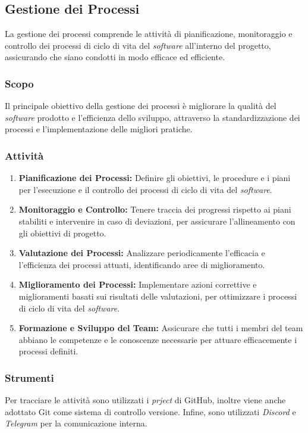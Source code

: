 \subsection{Gestione dei Processi}

La gestione dei processi comprende le attività di pianificazione, monitoraggio
e controllo dei processi di ciclo di vita del \textit{software} all'interno del
progetto, assicurando che siano condotti in modo efficace ed efficiente.

\subsubsection{Scopo}
Il principale obiettivo della gestione dei processi è migliorare la qualità
del \textit{software} prodotto e l'efficienza dello sviluppo, attraverso la
standardizzazione dei processi e l'implementazione delle migliori pratiche.

\subsubsection{Attività}
\begin{enumerate}
	\item \textbf{Pianificazione dei Processi:} Definire gli obiettivi, le
	      procedure e i piani per l'esecuzione e il controllo dei processi di
	      ciclo di vita del \textit{software}.
	\item \textbf{Monitoraggio e Controllo:} Tenere traccia dei progressi
	      rispetto ai piani stabiliti e intervenire in caso di deviazioni, per
	      assicurare l'allineamento con gli obiettivi di progetto.
	\item \textbf{Valutazione dei Processi:} Analizzare periodicamente
	      l'efficacia e l'efficienza dei processi attuati, identificando aree di
	      miglioramento.
	\item \textbf{Miglioramento dei Processi:} Implementare azioni correttive e
	      miglioramenti basati sui risultati delle valutazioni, per ottimizzare
	      i processi di ciclo di vita del \textit{software}.
	\item \textbf{Formazione e Sviluppo del Team:} Assicurare che tutti i membri
	      del team abbiano le competenze e le conoscenze necessarie per attuare
	      efficacemente i processi definiti.
\end{enumerate}

\subsubsection{Strumenti}
Per tracciare le attività sono utilizzati i \textit{prject} di GitHub, inoltre
viene anche adottato Git come sistema di controllo versione. Infine, sono
utilizzati \textit{Discord} e \textit{Telegram} per la comunicazione interna.

